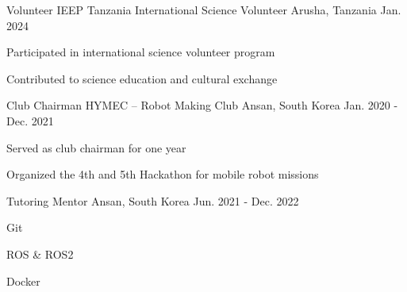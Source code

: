 

\begin{cventries}

\cventry
{Volunteer} %
{IEEP Tanzania International Science Volunteer} %
{Arusha, Tanzania} %
{Jan. 2024} %
{
  \begin{cvitems} %
    \item {Participated in international science volunteer program}
    \item {Contributed to science education and cultural exchange}
  \end{cvitems}
}

  \cventry
    {Club Chairman} %
    {HYMEC – Robot Making Club} %
    {Ansan, South Korea} %
    {Jan. 2020 - Dec. 2021} %
    {
      \begin{cvitems} %
        \item {Served as club chairman for one year}
        \item {Organized the 4th and 5th Hackathon for mobile robot missions}
      \end{cvitems}
    }

  \cventrycompact
    {} %
    {Tutoring Mentor} %
    {Ansan, South Korea} %
    {Jun. 2021 - Dec. 2022} %
    {
      \begin{cvitems} %
        \item {Git}
        \item {ROS \& ROS2}
        \item {Docker}
      \end{cvitems}
    }

\end{cventries}
